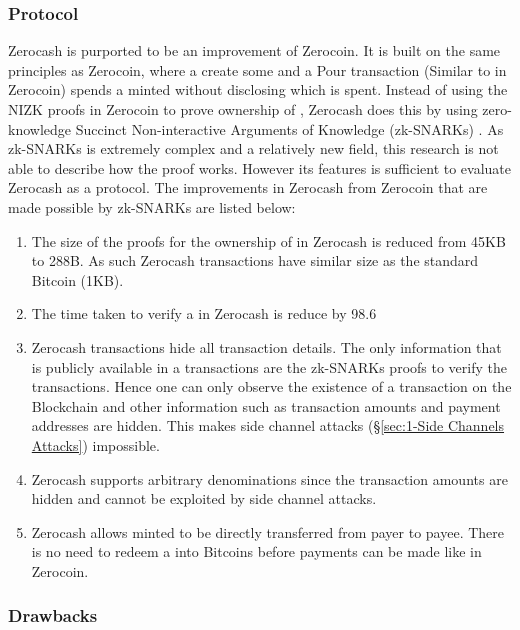 \subsubsection{Protocol}
\label{sec:2-Zerocash Protocol}
Zerocash is purported to be an improvement of Zerocoin. It is built on the same principles as Zerocoin, where a  create some  and a Pour transaction (Similar to  in Zerocoin) spends a minted \kwCoin{} without disclosing which \kwCoin{} is spent. Instead of using the NIZK proofs in Zerocoin to prove ownership of , Zerocash does this by using zero-knowledge Succinct Non-interactive Arguments of Knowledge (zk-SNARKs) \cite{Ben-sasson2013}. As zk-SNARKs is extremely complex and a relatively new field, this research is not able to describe how the proof works. However its features is sufficient to evaluate Zerocash as a protocol. The improvements in Zerocash from Zerocoin that are made possible by zk-SNARKs are listed below:

\begin{enumerate}
	\item The size of the proofs for the ownership of  in Zerocash is reduced from 45KB to 288B. As such Zerocash transactions have similar size as the standard Bitcoin  (1KB). 
	\item The time taken to verify a  in Zerocash is reduce by 98.6%
	\item Zerocash transactions hide all transaction details. The only information that is publicly available in a transactions are the zk-SNARKs proofs to verify the transactions. Hence one can only observe the existence of a transaction on the Blockchain and other information such as transaction amounts and payment addresses are hidden. This makes side channel attacks (\S\ref{sec:1-Side Channels Attacks}) impossible.
	\item Zerocash supports arbitrary denominations since the transaction amounts are hidden and cannot be exploited by side channel attacks.
	\item Zerocash allows minted  to be directly transferred from payer to payee. There is no need to redeem a \kwCoin{} into Bitcoins before payments can be made like in Zerocoin.
\end{enumerate}

\subsubsection{Drawbacks}
\label{sec:2-Zerocash Drawbacks}

